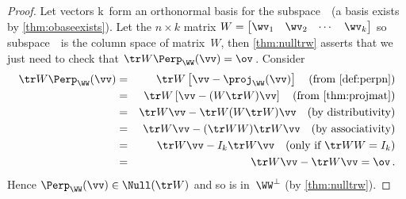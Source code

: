 \begin{proof} 
Let vectors \hlist\wv k\ form an orthonormal basis for the subspace~\WW\ (a basis exists by \cref{thm:obaseexists}).
Let the \(n\times k\) matrix \(W=\begin{bmatrix} \wv_1&\wv_2&\cdots&\wv_k \end{bmatrix}\) so subspace~\WW\ is the column space of matrix~\(W\), then \cref{thm:nulltrw} asserts that we just need to check that \(\tr W\Perp_\WW(\vv)=\ov\)\,.
Consider 
\begin{eqnarray*}
\tr W\Perp_\WW(\vv)
&=&\tr W\left[\vv-\proj_\WW(\vv)\right]
\quad(\text{from \cref{def:perpn}})
\\&=&\tr W\left[\vv-(W\tr W)\vv\right]
\quad(\text{from \cref{thm:projmat}})
\\&=&\tr W\vv-\tr W(W\tr W)\vv
\quad(\text{by distributivity})
\\&=&\tr W\vv-(\tr WW)\tr W\vv 
\quad(\text{by associativity})
\\&=&\tr W\vv-I_k\tr W\vv 
\quad(\text{only if }\tr WW=I_k)
\\&=&\tr W\vv-\tr W\vv =\ov\,.
\end{eqnarray*}
Hence \(\Perp_\WW(\vv)\in\Null(\tr W)\) and so is in~\(\WW^\perp\) (by \cref{thm:nulltrw}).


\end{proof}
